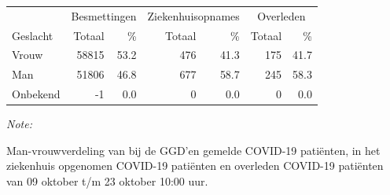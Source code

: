 \documentclass[
  english,
  man,floatsintext]{apa6}
\begin{document}
\begin{table}[H]
\centering\begingroup\fontsize{11}{13}\selectfont

\begin{threeparttable}
\begin{tabular}{lrrrrrr}
\toprule
\multicolumn{1}{c}{ } & \multicolumn{2}{c}{Besmettingen} & \multicolumn{2}{c}{Ziekenhuisopnames} & \multicolumn{2}{c}{Overleden} \\
\cmidrule(l{3pt}r{3pt}){2-3} \cmidrule(l{3pt}r{3pt}){4-5} \cmidrule(l{3pt}r{3pt}){6-7}
Geslacht & Totaal & \% & Totaal & \% & Totaal & \%\\
\midrule
Vrouw & 58815 & 53.2 & 476 & 41.3 & 175 & 41.7\\
Man & 51806 & 46.8 & 677 & 58.7 & 245 & 58.3\\
Onbekend & -1 & 0.0 & 0 & 0.0 & 0 & 0.0\\
\bottomrule
\end{tabular}
\begin{tablenotes}
\item \textit{Note: } 
\item Man-vrouwverdeling van bij de GGD’en gemelde COVID-19 patiënten, in het ziekenhuis opgenomen COVID-19 patiënten en overleden COVID-19 patiënten van 09 oktober t/m 23 oktober 10:00 uur.
\end{tablenotes}
\end{threeparttable}
\endgroup{}
\end{table}
\newpage
\end{document}
